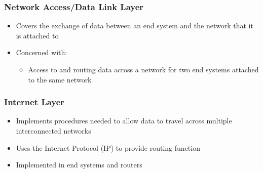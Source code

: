 \documentclass[pdflatex,compress]{beamer}
\begin{document}
\begin{frame}
	\frametitle{Network Access/Data Link Layer}
	\begin{itemize}
		\item Covers the exchange of data between an end system and the network that it is attached to
		\item Concerned with:
		\begin{itemize}
			\item Access to and routing data across a network for two end systems attached to the same network
		\end{itemize}
	\end{itemize}
\end{frame}

\begin{frame}
	\frametitle{Internet Layer}
	\begin{itemize}
		\item Implements procedures needed to allow data to travel across multiple interconnected networks
		\item Uses the Internet Protocol (IP) to provide routing function
		\item Implemented in end systems and routers
	\end{itemize}
\end{frame}
\end{document}
